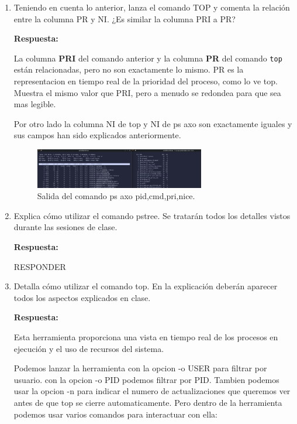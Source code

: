 \documentclass[a4paper,12pt]{article}
\begin{document}
\begin{enumerate}[label=\textbf{Pregunta \arabic*.}]
\begin{itemize}
    \end{itemize}
    \newpage
    \item Teniendo en cuenta lo anterior, lanza el comando TOP y comenta la relación entre la columna PR y NI. ¿Es similar la columna PRI a PR?

    \textbf{Respuesta:}
    
    La columna \textbf{PRI} del comando anterior y la columna \textbf{PR} del comando \texttt{top} están relacionadas, pero no son exactamente lo mismo. PR es la representacion en tiempo real de la prioridad del proceso, como lo ve top. Muestra el mismo valor que PRI, pero a menudo se redondea para que sea mas legible.

    Por otro lado la columna NI de top y NI de ps axo son exactamente iguales y sus campos han sido explicados anteriormente.

    \begin{figure}[h!]
        \centering
        \includegraphics[width=0.7\textwidth]{4.png}
        \caption{Salida del comando ps axo pid,cmd,pri,nice.}
    \end{figure}

    \item Explica cómo utilizar el comando pstree. Se tratarán todos los detalles vistos
    durante las sesiones de clase.

    \textbf{Respuesta:} 

    RESPONDER


    \item Detalla cómo utilizar el comando top. En la explicación deberán aparecer todos los aspectos explicados en clase.

    \textbf{Respuesta:}
    
    Esta herramienta proporciona una vista en tiempo real de los procesos en ejecución y el uso de recursos del sistema. 

    
    Podemos lanzar la herramienta con la opcion -o USER para filtrar por usuario. con la opcion -o PID podemos filtrar por PID. Tambien podemos usar la opcion -n para indicar el numero de actualizaciones que queremos ver antes de que top se cierre automaticamente. Pero dentro de la herramienta podemos usar varios comandos para interactuar con ella:
    


\end{enumerate}
\end{document}
